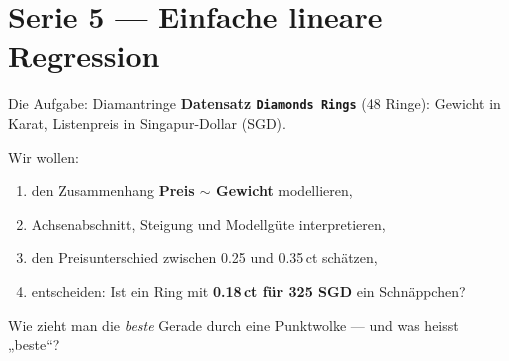 \documentclass[aspectratio=169,11pt]{beamer}
\begin{document}
\section{Serie 5 --- Einfache lineare Regression}

\begin{frame}{Die Aufgabe: Diamantringe}
\textbf{Datensatz \texttt{Diamonds Rings}} (48 Ringe): Gewicht in Karat,
Listenpreis in Singapur-Dollar (SGD).

\vspace{0.3cm}
Wir wollen:
\begin{enumerate}
  \item den Zusammenhang \textbf{Preis $\sim$ Gewicht} modellieren,
  \item Achsenabschnitt, Steigung und Modellgüte interpretieren,
  \item den Preisunterschied zwischen 0.25 und 0.35\,ct schätzen,
  \item entscheiden: Ist ein Ring mit \textbf{0.18\,ct für 325 SGD} ein
        \alert{Schnäppchen}?
\end{enumerate}

\vspace{0.3cm}
\begin{merke}[Leitfrage]
Wie zieht man die \emph{beste} Gerade durch eine Punktwolke --- und was
heisst „beste``?
\end{merke}
\end{frame}
\end{document}
